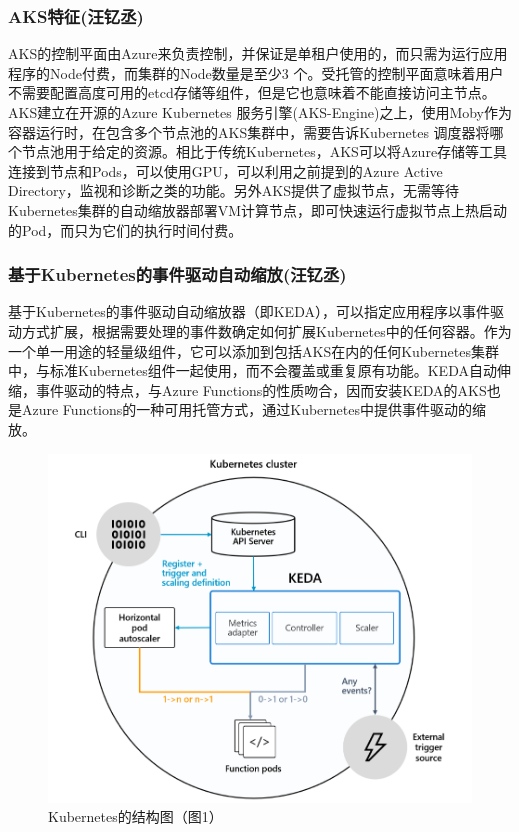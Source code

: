 \documentclass[11pt]{article}
\begin{document}
\subsubsection{AKS特征(汪钇丞)}
AKS的控制平面由Azure来负责控制，并保证是单租户使用的，而只需为运行应用程序的Node付费，而集群的Node数量是至少3 个。受托管的控制平面意味着用户不需要配置高度可用的etcd存储等组件，但是它也意味着不能直接访问主节点。AKS建立在开源的Azure Kubernetes 服务引擎(AKS-Engine)之上，使用Moby作为容器运行时，在包含多个节点池的AKS集群中，需要告诉Kubernetes 调度器将哪个节点池用于给定的资源。相比于传统Kubernetes，AKS可以将Azure存储等工具连接到节点和Pods，可以使用GPU，可以利用之前提到的Azure Active Directory，监视和诊断之类的功能。另外AKS提供了虚拟节点，无需等待Kubernetes集群的自动缩放器部署VM计算节点，即可快速运行虚拟节点上热启动的Pod，而只为它们的执行时间付费。
\subsubsection{基于Kubernetes的事件驱动自动缩放(汪钇丞)}
基于Kubernetes的事件驱动自动缩放器（即KEDA），可以指定应用程序以事件驱动方式扩展，根据需要处理的事件数确定如何扩展Kubernetes中的任何容器。作为一个单一用途的轻量级组件，它可以添加到包括AKS在内的任何Kubernetes集群中，与标准Kubernetes组件一起使用，而不会覆盖或重复原有功能。KEDA自动伸缩，事件驱动的特点，与Azure Functions的性质吻合，因而安装KEDA的AKS也是Azure Functions的一种可用托管方式，通过Kubernetes中提供事件驱动的缩放。
\begin{figure}[!htbp]
	\centering
	\includegraphics[scale=0.5]{figs/KEDA.PNG}
	\caption{Kubernetes的结构图（\cite{Kubernetes}图1）}
	\label{figs:KEDA}
\end{figure}
\end{document}
